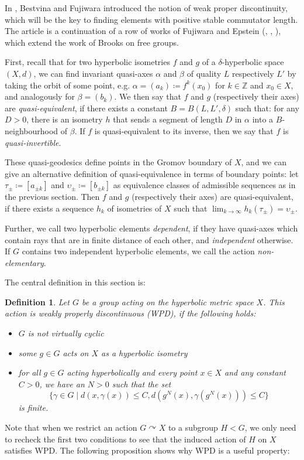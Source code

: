 \documentclass[a4paper]{article}
\newtheorem{definition}[theorem]{Definition}
\newcommand{\ZZ}{\mathbb{Z}}
\begin{document}
In \cite{Bestvina}, Bestvina and Fujiwara introduced the notion of weak proper discontinuity, which will be the key to finding elements with positive stable commutator length.
The article \cite{Bestvina} is a continuation of a row of works of Fujiwara and Epstein (\cite{epstein-fujiwara}, \cite{fujiwara-gromov-hyperbolic}, \cite{fujiwara-amalgamated}), which extend the work of Brooks \cite{Brooks} on free groups.

First, recall that for two hyperbolic isometries $f$ and $g$ of a $\delta$-hyperbolic space $(X,d)$, we can find invariant quasi-axes $\alpha$ and $\beta$ of quality $L$ respectively $L'$ by taking the orbit of some point, e.g. $\alpha = (a_k) \coloneqq f^k(x_0)$ for $k\in\ZZ$ and $x_0\in X$, and analogously for $\beta = (b_k)$.
We then say that $f$ and $g$ (respectively their axes) are \emph{quasi-equivalent}, if there exists a constant $B = B(L,L',\delta)$ such that:
for any $D>0$, there is an isometry $h$ that sends a segment of length $D$ in $\alpha$ into a $B$-neighbourhood of $\beta$.
If $f$ is quasi-equivalent to its inverse, then we say that $f$ is \emph{quasi-invertible}.

These quasi-geodesics define points in the Gromov boundary of $X$, and we can give an alternative definition of quasi-equivalence in terms of boundary points:
let $\tau_\pm \coloneqq [a_{\pm k}]$ and $\upsilon_\pm \coloneqq [b_{\pm k}]$ as equivalence classes of admissible sequences as in the previous section.
Then $f$ and $g$ (respectively their axes) are quasi-equivalent, if there exists a sequence $h_k$ of isometries of $X$ such that $\lim_{k\rightarrow \infty} h_k(\tau_\pm) = \upsilon_\pm$.

Further, we call two hyperbolic elements \emph{dependent}, if they have quasi-axes which contain rays that are in finite distance of each other, and \emph{independent} otherwise.
If $G$ contains two independent hyperbolic elements, we call the action \emph{non-elementary}.

The central definition in this section is:

\begin{definition}\label{def:wpd}
    Let $G$ be a group acting on the hyperbolic metric space $X$.
    This action is \emph{weakly properly discontinuous (WPD)}, if the following holds: \begin{itemize}
        \item $G$ is not virtually cyclic
        \item some $g\in G$ acts on $X$ as a hyperbolic isometry
        \item for all $g\in G$ acting hyperbolically and every point $x\in X$ and any constant $C>0$, we have an $N>0$ such that the set 
        \[\{\gamma \in G \mid d(x,\gamma(x)) \leq C, d(g^N(x),\gamma(g^N(x)))\leq C \}\]
        is finite.
    \end{itemize}
    \end{definition}
Note that when we restrict an action $G\curvearrowright X$ to a subgroup $H<G$, we only need to recheck the first two conditions to see that the induced action of $H$ on $X$ satisfies WPD.
The following proposition shows why WPD is a useful property:
\end{document}
